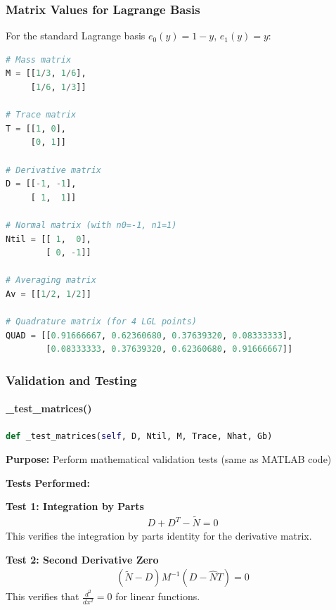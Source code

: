 \subsubsection{Matrix Values for Lagrange Basis}

For the standard Lagrange basis $e_0(y) = 1-y$, $e_1(y) = y$:

\begin{lstlisting}[language=Python, caption=Lagrange Basis Matrix Values]
# Mass matrix
M = [[1/3, 1/6],
     [1/6, 1/3]]

# Trace matrix  
T = [[1, 0],
     [0, 1]]

# Derivative matrix
D = [[-1, -1],
     [ 1,  1]]

# Normal matrix (with n0=-1, n1=1)
Ntil = [[ 1,  0],
        [ 0, -1]]

# Averaging matrix
Av = [[1/2, 1/2]]

# Quadrature matrix (for 4 LGL points)
QUAD = [[0.91666667, 0.62360680, 0.37639320, 0.08333333],
        [0.08333333, 0.37639320, 0.62360680, 0.91666667]]
\end{lstlisting}

\subsubsection{Validation and Testing}

\paragraph{\_test\_matrices()}\leavevmode
\begin{lstlisting}[language=Python, caption=Test Matrices Method]
def _test_matrices(self, D, Ntil, M, Trace, Nhat, Gb)
\end{lstlisting}

\textbf{Purpose:} Perform mathematical validation tests (same as MATLAB code)

\textbf{Tests Performed:}

\textbf{Test 1: Integration by Parts}
\begin{align}
D + D^T - \tilde{N} = 0
\end{align}
This verifies the integration by parts identity for the derivative matrix.

\textbf{Test 2: Second Derivative Zero}
\begin{align}
(\tilde{N} - D) M^{-1} (D - \hat{N} T) = 0
\end{align}
This verifies that $\frac{d^2}{dx^2} = 0$ for linear functions.

